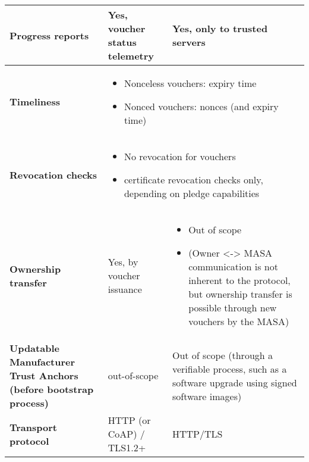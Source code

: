 \begin{landscape}
\begin{longtable}{|p{5cm}|l|l|}
		\hline
		\rowcolor[rgb]{ .745,  .804,  .843} \textbf{Progress reports} & \cellcolor[rgb]{ 1,  1,  1}Yes, voucher status telemetry & \cellcolor[rgb]{ 1,  1,  1}Yes, only to trusted servers \bigstrut\\

		\hline
		\rowcolor[rgb]{ .745,  .804,  .843} \textbf{Timeliness} & \multicolumn{2}{p{36.67em}|}{\cellcolor[rgb]{ 1,  1,  1}
		\begin{itemize}[leftmargin=*, topsep=0pt, noitemsep]
		\item
			Nonceless vouchers: expiry time
		\item
			Nonced vouchers: nonces (and expiry time)
		\end{itemize}
		} \bigstrut\\

		\hline
		\rowcolor[rgb]{ .745,  .804,  .843} \textbf{Revocation checks} & \multicolumn{2}{p{36.67em}|}{\cellcolor[rgb]{ 1,  1,  1}
		\begin{itemize}[leftmargin=*, topsep=0pt, noitemsep]
		\item
			No revocation for vouchers
		\item
			certificate revocation checks only, depending on pledge capabilities
		\end{itemize}
		 } \bigstrut\\

		\hline
		\rowcolor[rgb]{ .745,  .804,  .843} \textbf{Ownership transfer} & \cellcolor[rgb]{ 1,  1,  1}Yes, by voucher issuance & \multicolumn{1}{p{18.335em}|}{\cellcolor[rgb]{ 1,  1,  1}
		\begin{itemize}[leftmargin=*, topsep=0pt, noitemsep]
		\item
			Out of scope
		\item
			(Owner <-> MASA communication is not inherent to the protocol, but ownership transfer is possible through new vouchers by the MASA)
		\end{itemize}
		} \bigstrut\\

		\hline
		\rowcolor[rgb]{ .745,  .804,  .843} \textbf{Updatable Manufacturer Trust Anchors (before bootstrap process)} & \cellcolor[rgb]{ 1,  1,  1}out-of-scope & \multicolumn{1}{p{18.335em}|}{\cellcolor[rgb]{ 1,  1,  1}
			Out of scope (through a verifiable process, such as a software upgrade using signed software images)
		} \bigstrut\\

		\hline
		\rowcolor[rgb]{ .745,  .804,  .843} \textbf{Transport protocol} & \cellcolor[rgb]{ 1,  1,  1}HTTP (or CoAP) / TLS1.2+ & \cellcolor[rgb]{ 1,  1,  1}HTTP/TLS \bigstrut\\


\end{longtable}
\end{landscape}
